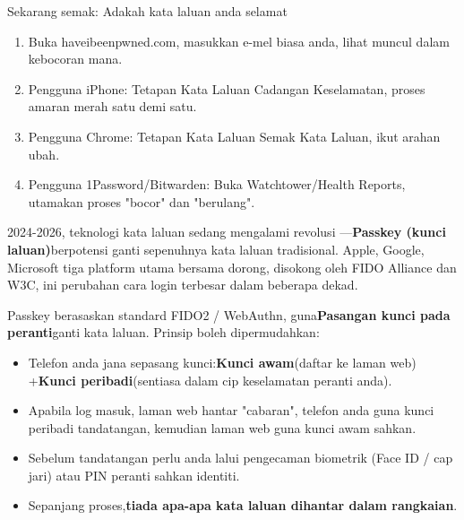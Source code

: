 \begin{tcbpractice}{Sekarang semak: Adakah kata laluan anda selamat}
\begin{enumerate}
  \item Buka haveibeenpwned.com, masukkan e-mel biasa anda, lihat muncul dalam kebocoran mana.
  \item Pengguna iPhone: Tetapan Kata Laluan Cadangan Keselamatan, proses amaran merah satu demi satu.
  \item Pengguna Chrome: Tetapan Kata Laluan Semak Kata Laluan, ikut arahan ubah.
  \item Pengguna 1Password/Bitwarden: Buka Watchtower/Health Reports, utamakan proses "bocor" dan "berulang".
\end{enumerate}

\end{tcbpractice}


2024-2026, teknologi kata laluan sedang mengalami revolusi —\textbf{Passkey (kunci laluan)}berpotensi ganti sepenuhnya kata laluan tradisional. Apple, Google, Microsoft tiga platform utama bersama dorong, disokong oleh FIDO Alliance dan W3C, ini perubahan cara login terbesar dalam beberapa dekad.


Passkey berasaskan standard FIDO2 / WebAuthn, guna\textbf{Pasangan kunci pada peranti}ganti kata laluan. Prinsip boleh dipermudahkan:

\begin{itemize}
  \item Telefon anda jana sepasang kunci:\textbf{Kunci awam}(daftar ke laman web) +\textbf{Kunci peribadi}(sentiasa dalam cip keselamatan peranti anda).
  \item Apabila log masuk, laman web hantar "cabaran", telefon anda guna kunci peribadi tandatangan, kemudian laman web guna kunci awam sahkan.
  \item Sebelum tandatangan perlu anda lalui pengecaman biometrik (Face ID / cap jari) atau PIN peranti sahkan identiti.
  \item Sepanjang proses,\textbf{tiada apa-apa kata laluan dihantar dalam rangkaian}.
\end{itemize}


